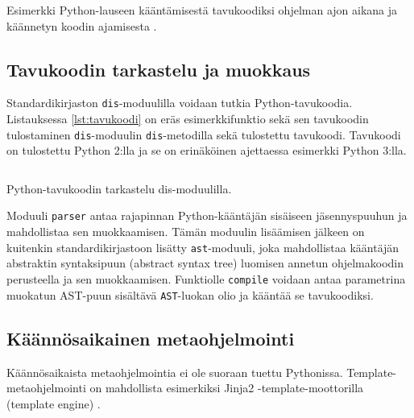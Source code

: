 \documentclass[finnish]{tktltiki2}
\theoremstyle{definition}
\theoremstyle{remark}
\begin{document}
\begin{listing}
    \inputminted[linenos]{python}{code/dynamichello.py}
    \caption{Esimerkki Python-lauseen kääntämisestä tavukoodiksi ohjelman ajon aikana ja käännetyn koodin ajamisesta \cite{codeobjects}.}
    \label{lst:ex_compile}
\end{listing}


\subsection{Tavukoodin tarkastelu ja muokkaus}

Standardikirjaston \verb|dis|-moduulilla voidaan tutkia Python-tavukoodia. Listauksessa \ref{lst:tavukoodi} on eräs esimerkkifunktio sekä sen tavukoodin tulostaminen \verb|dis|-moduulin \verb|dis|-metodilla sekä tulostettu tavukoodi. Tavukoodi on tulostettu Python 2:lla ja se on erinäköinen ajettaessa esimerkki Python 3:lla.


\begin{listing}
    \inputminted[linenos]{python}{code/tavukoodi.py}
    \caption{Python-tavukoodin tarkastelu dis-moduulilla.}
    \label{lst:tavukoodi}
\end{listing}

Moduuli \verb|parser| antaa rajapinnan Python-kääntäjän sisäiseen jäsennyspuuhun ja mahdollistaa sen muokkaamisen. Tämän moduulin lisäämisen jälkeen on kuitenkin standardikirjastoon lisätty \verb|ast|-moduuli, joka mahdollistaa kääntäjän abstraktin syntaksipuun (abstract syntax tree) luomisen annetun ohjelmakoodin perusteella ja sen muokkaamisen. Funktiolle \verb|compile| voidaan antaa parametrina muokatun AST-puun sisältävä \verb|AST|-luokan olio ja kääntää se tavukoodiksi.





\subsection{Käännösaikainen metaohjelmointi}

Käännösaikaista metaohjelmointia ei ole suoraan tuettu Pythonissa. Template-metaohjelmointi on mahdollista esimerkiksi Jinja2 -template-moottorilla (template engine) \cite{jinja}.
\end{document}
